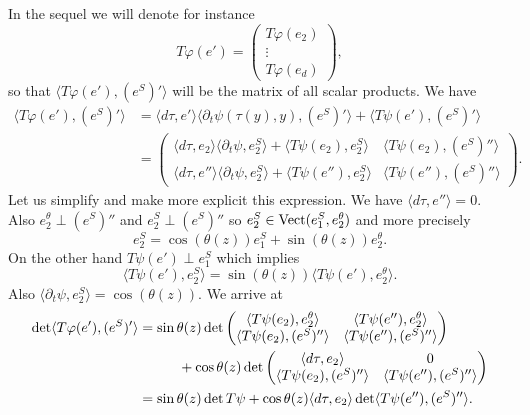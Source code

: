 \documentclass[JEP,XML,SOM,Unicode,NoFloatCountersInSection,published]{cedram}
\theoremstyle{plain}
\theoremstyle{definition}
\let\di\displaystyle
\begin{document}
\noindent
In the sequel we will denote for instance\vspace*{-3pt}
\[
\di T\varphi(e')=\left(\begin{matrix}T\varphi(e_2)\\ \vdots\\ T\varphi(e_d)\end{matrix}\right),
\]
so that $\langle T\varphi(e'), (e^S)'\rangle$ will be the matrix of all scalar products.
We have\vspace*{-3pt}
\begin{align*}
\langle T\varphi(e'), (e^S)'\rangle &=\langle d\tau,e'\rangle\langle \partial_t\psi(\tau(y),y), (e^S)'\rangle+ \langle T\psi(e'),(e^S)'\rangle\\
&=\left(\begin{matrix}
\langle d\tau,e_2\rangle\langle \partial_t\psi, e_2^S\rangle+\langle T\psi(e_2), e_2^S\rangle&
\langle T\psi(e_2),(e^S)''\rangle\\
\langle d\tau,e''\rangle\langle\partial_t\psi, e_2^S\rangle+\langle T\psi (e''), e_2^S\rangle
& \langle T\psi(e''),(e^S)''\rangle
\end{matrix}
\right).
\end{align*}
Let us simplify and make more explicit this expression.
We have $\langle d\tau,e''\rangle=0$. Also $e_2^\theta\perp (e^S)''$ and $e_2^S\perp (e^S)''$ so $e_2^S\in {\rm Vect}(e_1^S, e_2^\theta)$ and more precisely
\begin{equation}
e_2^S=\cos(\theta(z)) e_1^S+\sin(\theta(z))e_2^\theta.
\end{equation}
On the other hand $T\psi(e')\perp e_1^S$ which implies
\begin{equation}
\langle T\psi(e'),e_2^S\rangle =\sin(\theta(z))\langle T\psi(e'), e_2^\theta\rangle.
\end{equation}
Also $\langle \partial_t\psi, e_2^S\rangle =\cos(\theta(z)).$ We arrive at
\begin{equation}
\begin{split}
\det\langle T\varphi(e'),(e^S)'\rangle&=\sin\theta(z)\det\left(
\begin{matrix}
\langle T\psi(e_2), e_2^\theta\rangle &\langle T\psi(e''),e_2^\theta\rangle\\
\langle T\psi(e_2),(e^S)''\rangle & \langle T\psi(e''),(e^S)''\rangle
\end{matrix}
\right)\\
&\hspace*{1cm}+\cos\theta(z)\det\left(\begin{matrix}
\langle d\tau, e_2\rangle &{0}\\
\langle T\psi(e_2), (e^S)''\rangle & \langle T\psi(e''), (e^S)''\rangle
\end{matrix}
\right)\\
&= \sin\theta(z)\det T\psi+\cos\theta(z) \langle d\tau, e_2\rangle \det \langle T\psi(e''),(e^S)''\rangle.
\end{split}
\end{equation}
\end{document}
